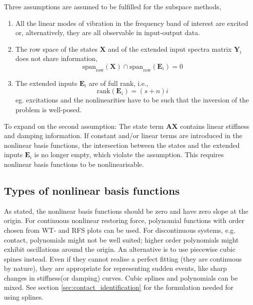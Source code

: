 Three assumptions are assumed to be fulfilled for the subspace methods,
\begin{enumerate}
\item All the linear modes of vibration in the frequency band of interest are
  excited or, alternatively, they are all observable in input-output data.
\item The row space of the states $\bm X$ and of the extended input spectra
  matrix $\bm Y_i$ does not share information,
  \begin{equation*}
    \text{span}_{\text{row}} (\bm X) \cap \text{span}_{\text{row}}(\bm E_i) = 0
  \end{equation*}
\item The extended inputs $\bm E_i$ are of full rank, i.e.,
  \begin{equation*}
    \text{rank}(\bm E_i) = (s+n) i
  \end{equation*}
  eg. excitations and the nonlinearities have to be such that the inversion of the
  problem is well-posed.
\end{enumerate}

To expand on the second assumption:
The state term $\bm A \bm X$ contains linear stiffness and damping information.
If constant and/or linear terms are introduced in the nonlinear basis functions,
the intersection between the states and the extended inputs $\bm E_i$ is no
longer empty, which violate the assumption.
This requires nonlinear basis functions to be nonlinearisable.

\FloatBarrier


\subsection{Types of nonlinear basis functions}
\label{sec:fnsi_functional}


As stated, the nonlinear basis functions should be zero and have zero slope at
the origin. For continuous nonlinear restoring force, polynomial functions with
order chosen from WT- and RFS plots can be used. For discontinuous systems, e.g.
contact, polynomials might not be well suited; higher order polynomials might
exhibit oscillations around the origin. An alternative is to use piecewise cubic
spines instead. Even if they cannot realise a perfect fitting (they are
continuous by nature), they are appropriate for representing sudden events, like
sharp changes in stiffness(or damping) curves. Cubic splines and polynomials can
be mixed. See section \ref{sec:contact_identification} for the formulation
needed for using splines.

